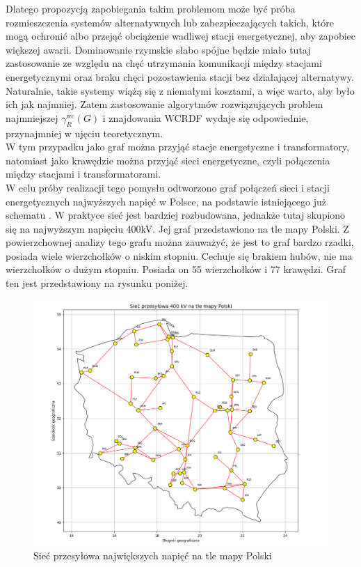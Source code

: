 Dlatego propozycją zapobiegania takim problemom może być próba rozmieszczenia systemów alternatywnych lub zabezpieczających takich, które mogą ochronić albo przejąć obciążenie wadliwej stacji energetycznej, aby zapobiec większej awarii. Dominowanie rzymskie słabo spójne będzie miało tutaj zastosowanie ze względu na chęć utrzymania komunikacji między stacjami energetycznymi oraz braku chęci pozostawienia stacji bez działającej alternatywy. Naturalnie, takie systemy wiążą się z niemałymi kosztami, a więc warto, aby było ich jak najmniej. Zatem zastosowanie algorytmów rozwiązujących problem najmniejszej $\gamma^{\text{wc}}_R(G)$ i znajdowania WCRDF wydaje się odpowiednie, przynajmniej w ujęciu teoretycznym.\\
W tym przypadku jako graf można przyjąć stacje energetyczne i transformatory, natomiast jako krawędzie można przyjąć sieci energetyczne, czyli połączenia między stacjami i transformatorami.\\
W celu próby realizacji tego pomysłu odtworzono graf połączeń sieci i stacji energetycznych najwyższych napięć w Polsce, na podstawie istniejącego już schematu \cite{POLAND}. W praktyce sieć jest bardziej rozbudowana, jednakże tutaj skupiono się na najwyższym napięciu 400kV. Jej graf przedstawiono na tle mapy Polski. Z powierzchownej analizy tego grafu można zauważyć, że jest to graf bardzo rzadki, posiada wiele wierzchołków o niskim stopniu. Cechuje się brakiem hubów, nie ma wierzchołków o dużym stopniu. Posiada on 55 wierzchołków i 77 krawędzi. Graf ten jest przedstawiony na rysunku poniżej.

\begin{figure}[H]
    \centering
    \includegraphics[width=\textwidth]{assets/Poland/image.png}
    \caption{Sieć przesyłowa największych napięć na tle mapy Polski}
    \label{fig:poland}
\end{figure}

